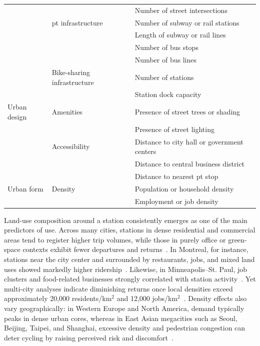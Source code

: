 \begin{table}[hpbt!]
{\begin{tabular}{lll}
                & & Number of street intersections \\
                & \ac{pt} infrastructure & Number of subway or rail stations \\
                & & Length of subway or rail lines \\
                & & Number of bus stops \\
                & & Number of bus lines \\
                \midrule
                & Bike-sharing infrastructure & Number of stations \\
                & & Station dock capacity \\
                \midrule
                Urban design & Amenities & Presence of street trees or shading \\
                & & Presence of street lighting \\
                & Accessibility & Distance to city hall or government centers \\
                & & Distance to central business district \\
                & & Distance to nearest \ac{pt} stop \\
                \midrule
                Urban form & Density & Population or household density \\
                & & Employment or job density \\
                \bottomrule
            \end{tabular}
            }
        \end{table}

        Land-use composition around a station consistently emerges as one of the main predictors of use. Across many cities, stations in dense residential and commercial areas tend to register higher trip volumes, while those in purely office or green-space contexts exhibit fewer departures and returns~\cite{FaghihImani2014, FaghihImani2016, MateoBabiano2016, FaghihImani2017, Sun2018, FaghihImani2017Empirical}. In Montreal, for instance, stations near the city center and surrounded by restaurants, jobs, and mixed land uses showed markedly higher ridership~\cite{FaghihImani2014}. Likewise, in Minneapolis–St. Paul, job clusters and food-related businesses strongly correlated with station activity~\cite{Wang2016}. Yet multi-city analyses indicate diminishing returns once local densities exceed approximately 20,000 residents/km$^{2}$ and 12,000 jobs/km$^{2}$~\cite{Chen2021_Identifying}. Density effects also vary geographically: in Western Europe and North America, demand typically peaks in dense urban cores, whereas in East Asian megacities such as Seoul, Beijing, Taipei, and Shanghai, excessive density and pedestrian congestion can deter cycling by raising perceived risk and discomfort~\cite{Liu2019, Ji2020, Rixey2013, Lin2020}.


